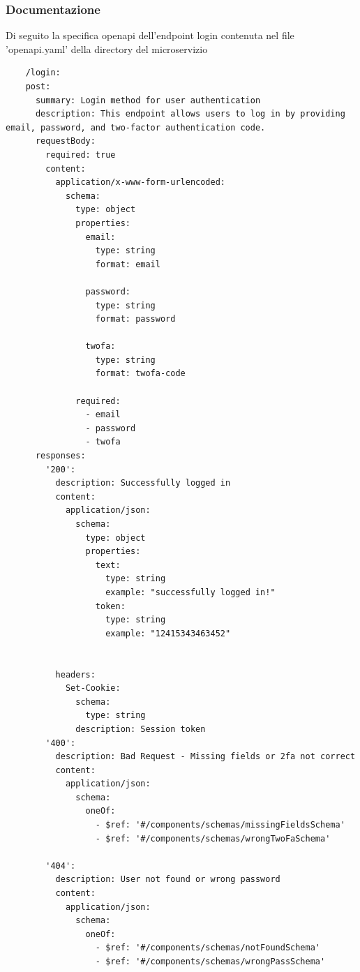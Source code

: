 \documentclass{report}
\begin{document}
\subsubsection*{Documentazione}
Di seguito la specifica openapi dell'endpoint login contenuta nel file 'openapi.yaml' della directory del microservizio
\begin{verbatim}
	/login:
    post:
      summary: Login method for user authentication
      description: This endpoint allows users to log in by providing email, password, and two-factor authentication code.
      requestBody:
        required: true
        content:
          application/x-www-form-urlencoded:
            schema:
              type: object
              properties:
                email:
                  type: string
                  format: email

                password:
                  type: string
                  format: password
                  
                twofa:
                  type: string
                  format: twofa-code
               
              required:
                - email
                - password
                - twofa
      responses:
        '200':
          description: Successfully logged in
          content:
            application/json:
              schema:
                type: object
                properties:
                  text:
                    type: string
                    example: "successfully logged in!"
                  token:
                    type: string
                    example: "12415343463452"
            

          headers:
            Set-Cookie:
              schema:
                type: string
              description: Session token
        '400':
          description: Bad Request - Missing fields or 2fa not correct
          content:
            application/json:
              schema:
                oneOf:
                  - $ref: '#/components/schemas/missingFieldsSchema'
                  - $ref: '#/components/schemas/wrongTwoFaSchema'
      
        '404':
          description: User not found or wrong password
          content:
            application/json:
              schema:
                oneOf:
                  - $ref: '#/components/schemas/notFoundSchema'
                  - $ref: '#/components/schemas/wrongPassSchema'
\end{verbatim}
\end{document}
